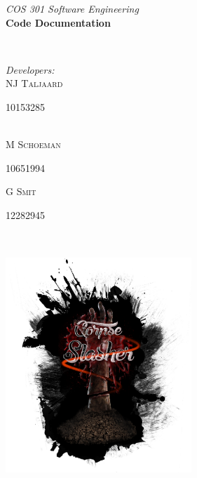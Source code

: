 \documentclass[letterpaper]{article}
\makeatletter
\def\printauthor{%
    {\large \@author}}
\makeatother
\begin{document}
\begin{titlepage}
\begin{center}
\begin{minipage}{0.4\textwidth}
\begin{flushleft} \large
\emph{COS 301 Software Engineering}\\
\vspace{1cm}
\textbf{Code Documentation}
\end{flushleft}
\end{minipage}
~
\begin{minipage}{0.4\textwidth}
	\begin{flushright} \large
	\emph{Developers:} \\
		NJ \textsc{Taljaard} \\
			\begin{small}
				10153285
			\end{small} \\
		M  \textsc{Schoeman} \\
			\begin{small}
				10651994 \\
			\end{small}
		G  \textsc{Smit} \\
			\begin{small}
				12282945
			\end{small}
	\end{flushright}
\end{minipage}\\



\includegraphics[width=70mm, height=90mm]{corpseslasher.png}\\ %
 

\end{center}
\end{titlepage}
\end{document}
